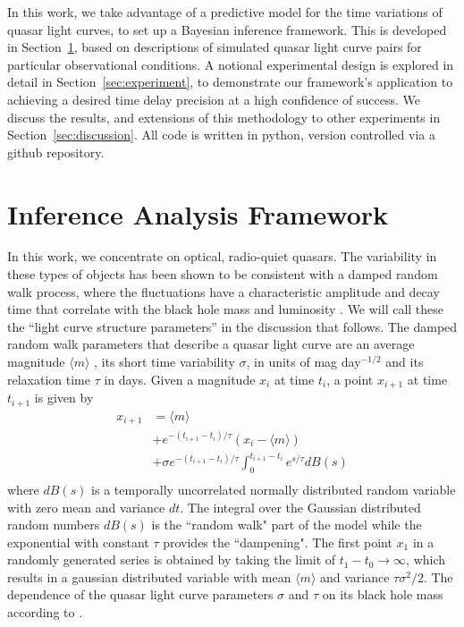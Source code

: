 \documentclass{emulateapj}
\begin{document}
In this work, we take advantage of a predictive model for the time
variations of quasar light curves, to set up a Bayesian inference
framework.  This is developed in Section~\ref{sec:tdanalysis}, based
on descriptions of simulated quasar light curve pairs for particular
observational conditions.  A notional experimental design is explored
in detail in Section~\ref{sec:experiment}, to demonstrate our
framework's application to achieving a desired time delay precision at
a high confidence of success.  We discuss the results, and extensions
of this methodology to other experiments in
Section~\ref{sec:discussion}.  All code is written in python, version
controlled via a github repository.

\section{Inference Analysis Framework}\label{sec:tdanalysis}

In this work, we concentrate on optical, radio-quiet quasars. The
variability in these types of objects has been shown to be consistent
with a damped random walk process, where the fluctuations have a
characteristic amplitude and decay time that correlate with the black
hole mass and luminosity \citep{Kelly2009a}.  We will call these the
``light curve structure parameters'' in the discussion that follows.
The damped random walk parameters that describe a quasar light curve
are an average magnitude $\langle m \rangle$ , its short time
variability $\sigma$, in units of mag day$^{-1/2}$ and its relaxation
time $\tau$ in days. Given a magnitude $x_i$ at time $t_i$, a point
$x_{i+1}$ at time $t_{i+1}$ is given by
\begin{equation}
\begin{split}
x_{i+1}&  =  \langle m \rangle  \\
&+ e^{-(t_{i+1}-t_i)/\tau}\left(x_{i}-\langle m \rangle\right)\\
&+ \sigma e^{-(t_{i+1}-t_i)/\tau}\int_{0}^{t_{i+1}-t_{i}}e^{s/\tau}dB(s)\\
\end{split}
\label{eq:generative}
\end{equation} 
where $dB(s)$ is a temporally uncorrelated normally distributed random variable with zero mean and variance $dt$. The integral over
the Gaussian distributed random numbers $dB(s)$ is the ``random walk" part of the model while the exponential with constant $\tau$ provides
the ``dampening".
The first point $x_1$ in a randomly generated series is obtained by taking the limit of
$t_1-t_0\to\infty$, which results in a gaussian distributed variable with mean $\langle m \rangle$ and variance $\tau\sigma^2/2$.
The dependence of the quasar light curve parameters $\sigma$ and $\tau$ on its black hole mass according to \citep{Kelly2009a}.
\end{document}
